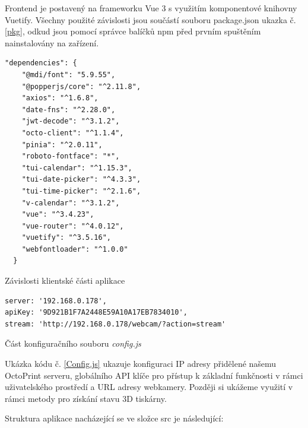 \documentclass[twoside, 12pt]{article}
\begin{document}
Frontend je postavený na frameworku Vue 3 s využitím komponentové knihovny Vuetify. Všechny použité závislosti jsou součástí souboru package.json ukazka č. \ref{pkg}, odkud jsou pomocí správce balíčků npm před prvním spuštěním nainstalovány na zařízení.

\begin{listing}
\begin{verbatim}
"dependencies": {
    "@mdi/font": "5.9.55",
    "@popperjs/core": "^2.11.8",
    "axios": "^1.6.8",
    "date-fns": "^2.28.0",
    "jwt-decode": "^3.1.2",
    "octo-client": "^1.1.4",
    "pinia": "^2.0.11",
    "roboto-fontface": "*",
    "tui-calendar": "^1.15.3",
    "tui-date-picker": "^4.3.3",
    "tui-time-picker": "^2.1.6",
    "v-calendar": "^3.1.2",
    "vue": "^3.4.23",
    "vue-router": "^4.0.12",
    "vuetify": "^3.5.16",
    "webfontloader": "^1.0.0"
  }
\end{verbatim}
\caption{Závislosti klientské části aplikace}
\label{pkg}
\end{listing}

\begin{listing}
\begin{verbatim}
server: '192.168.0.178',
apiKey: '9D921B1F7A2448E59A10A17EB7834010',
stream: 'http://192.168.0.178/webcam/?action=stream'
\end{verbatim}
\caption{Část konfiguračního souboru \textit{config.js}}
\label{Config.js}
\end{listing}

Ukázka kódu č. \ref{Config.js} ukazuje konfiguraci IP adresy přidělené našemu OctoPrint serveru, globálního API klíče pro přístup k základní funkčnosti v rámci uživatelského prostředí a URL adresy webkamery. Později si ukážeme využití v rámci metody pro získání stavu 3D tiskárny.


Struktura aplikace nacházející se ve složce src je následující:
\end{document}
